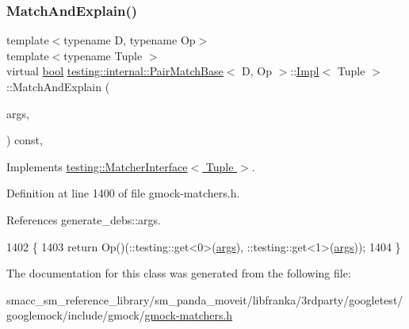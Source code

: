 \subsubsection{\texorpdfstring{Match\+And\+Explain()}{MatchAndExplain()}}
{\footnotesize\ttfamily template$<$typename D, typename Op$>$ \\
template$<$typename Tuple $>$ \\
virtual \hyperlink{classbool}{bool} \hyperlink{classtesting_1_1internal_1_1PairMatchBase}{testing\+::internal\+::\+Pair\+Match\+Base}$<$ D, Op $>$\+::\hyperlink{classtesting_1_1internal_1_1PairMatchBase_1_1Impl}{Impl}$<$ Tuple $>$\+::Match\+And\+Explain (\begin{DoxyParamCaption}\item[{Tuple}]{args,  }\item[{\hyperlink{classtesting_1_1MatchResultListener}{Match\+Result\+Listener} $\ast$}]{ }\end{DoxyParamCaption}) const\hspace{0.3cm}{\ttfamily [inline]}, {\ttfamily [virtual]}}



Implements \hyperlink{classtesting_1_1MatcherInterface_a296b43607cd99d60365f0e6a762777cf}{testing\+::\+Matcher\+Interface$<$ Tuple $>$}.



Definition at line 1400 of file gmock-\/matchers.\+h.



References generate\+\_\+debs\+::args.


\begin{DoxyCode}
1402                                       \{
1403       \textcolor{keywordflow}{return} Op()(::testing::get<0>(\hyperlink{namespacegenerate__debs_a75f9143e38df82d83b2e8a6f99cae02c}{args}), ::testing::get<1>(\hyperlink{namespacegenerate__debs_a75f9143e38df82d83b2e8a6f99cae02c}{args}));
1404     \}
\end{DoxyCode}


The documentation for this class was generated from the following file\+:\begin{DoxyCompactItemize}
\item 
smacc\+\_\+sm\+\_\+reference\+\_\+library/sm\+\_\+panda\+\_\+moveit/libfranka/3rdparty/googletest/googlemock/include/gmock/\hyperlink{gmock-matchers_8h}{gmock-\/matchers.\+h}\end{DoxyCompactItemize}
